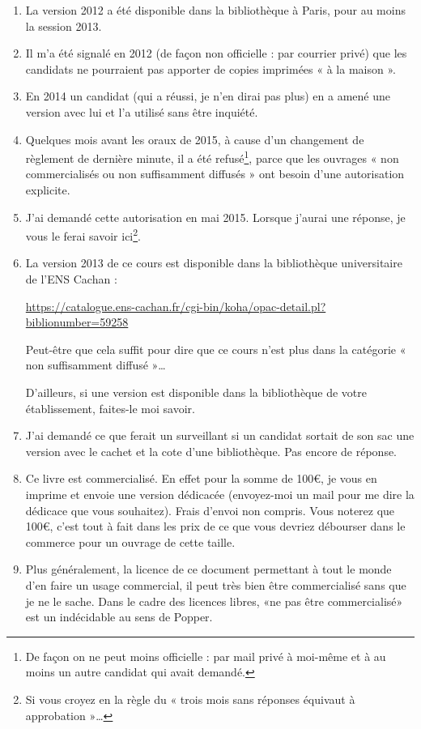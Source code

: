 \begin{enumerate}
    \item
        La version 2012 a été disponible dans la bibliothèque à Paris, pour au moins la session 2013.
    \item 
        Il m'a été signalé en 2012 (de façon non officielle : par courrier privé) que les candidats ne pourraient pas apporter de copies imprimées « à la maison ».
    \item
        En 2014 un candidat (qui a réussi, je n'en dirai pas plus) en a amené une version avec lui et l'a utilisé sans être inquiété.
    \item
        Quelques mois avant les oraux de 2015, à cause d'un changement de règlement de dernière minute, il a été refusé\footnote{De façon on ne peut moins officielle : par mail privé à moi-même et à au moins un autre candidat qui avait demandé.}, parce que les ouvrages « non commercialisés ou non suffisamment diffusés » ont besoin d'une autorisation explicite.
    \item
        J'ai demandé cette autorisation en mai 2015. Lorsque j'aurai une réponse, je vous le ferai savoir ici\footnote{Si vous croyez en la règle du « trois mois sans réponses équivaut à approbation »\ldots}.
    \item
        La version 2013 de ce cours est disponible dans la bibliothèque universitaire de l'ENS Cachan :
        \begin{center}
            \url{https://catalogue.ens-cachan.fr/cgi-bin/koha/opac-detail.pl?biblionumber=59258}
        \end{center}
        Peut-être que cela suffit pour dire que ce cours n'est plus dans la catégorie « non suffisamment diffusé »\ldots

        D'ailleurs, si une version est disponible dans la bibliothèque de votre établissement, faites-le moi savoir.
    \item
        J'ai demandé ce que ferait un surveillant si un candidat sortait de son sac une version avec le cachet et la cote d'une bibliothèque. Pas encore de réponse.
    \item
        Ce livre est commercialisé. En effet pour la somme de 100€, je vous en imprime et envoie une version dédicacée (envoyez-moi un mail pour me dire la dédicace que vous souhaitez). Frais d'envoi non compris. Vous noterez que 100€, c'est tout à fait dans les prix de ce que vous devriez débourser dans le commerce pour un ouvrage de cette taille.
    \item
        Plus généralement, la licence de ce document permettant à tout le monde d'en faire un usage commercial, il peut très bien être commercialisé sans que je ne le sache. Dans le cadre des licences libres, «ne pas être commercialisé» est un indécidable au sens de Popper.
\end{enumerate}

